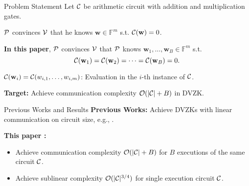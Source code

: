 \begin{frame}{Problem Statement}
	Let $\mathcal{C}$ be arithmetic circuit with addition and multiplication gates.
	
	$\mathcal{P}$ convinces $\mathcal{V}$ that he knows $\mathbf{w} \in \mathbb{F}^m$ s.t. $\mathcal{C}(\mathbf{w}) = 0$.
	
	\textbf{In this paper}, $\mathcal{P}$ convinces $\mathcal{V}$ that $\mathcal{P}$ knows $\mathbf{w}_1, \dots, \mathbf{w}_B \in \mathbb{F}^m$ s.t.
	\begin{equation*}
		\mathcal{C}(\mathbf{w}_1) = \mathcal{C}(\mathbf{w}_2) = \dots = \mathcal{C}(\mathbf{w}_B) = 0.
	\end{equation*}

	$\mathcal{C}(\mathbf{w}_i) = \mathcal{C}(w_{i,1}, \dots, w_{i, m})$: Evaluation in the $i$-th instance of $\mathcal{C}$.
	
	\textbf{Target:} Achieve communication complexity $\mathcal{O}(|\mathcal{C}| + B)$ in DVZK.
\end{frame}
\begin{frame}{Previous Works and Results}
	\textbf{Previous Works:} Achieve DVZKs with linear communication on circuit size, e.g., \cite{YangSWW21, BaumBMRS21, DittmerILO22}.
	
	\textbf{This paper \cite{Weng0YX022}:}
	\begin{itemize}
		\item Achieve communication complexity $\mathcal{O}(|\mathcal{C}| + B)$ for $B$ executions of the same circuit $\mathcal{C}$. 
		\item Achieve sublinear complexity $\mathcal{O}(|\mathcal{C}|^{3/4})$ for single execution circuit $\mathcal{C}$. 
	\end{itemize}
\end{frame}